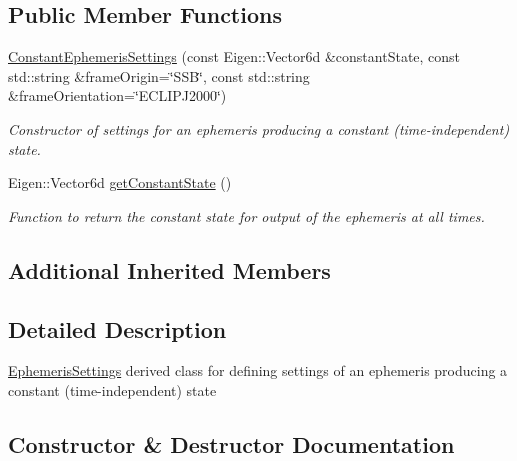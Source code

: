 \subsection*{Public Member Functions}
\begin{DoxyCompactItemize}
\item 
\hyperlink{classtudat_1_1simulation__setup_1_1ConstantEphemerisSettings_a8ae2c1f03a66ae4961f440b04425e58c}{Constant\+Ephemeris\+Settings} (const Eigen\+::\+Vector6d \&constant\+State, const std\+::string \&frame\+Origin=\char`\"{}S\+SB\char`\"{}, const std\+::string \&frame\+Orientation=\char`\"{}E\+C\+L\+I\+P\+J2000\char`\"{})
\begin{DoxyCompactList}\small\item\em Constructor of settings for an ephemeris producing a constant (time-\/independent) state. \end{DoxyCompactList}\item 
Eigen\+::\+Vector6d \hyperlink{classtudat_1_1simulation__setup_1_1ConstantEphemerisSettings_ae8e3890781719e6d8bc6829188e50d53}{get\+Constant\+State} ()
\begin{DoxyCompactList}\small\item\em Function to return the constant state for output of the ephemeris at all times. \end{DoxyCompactList}\end{DoxyCompactItemize}
\subsection*{Additional Inherited Members}


\subsection{Detailed Description}
\hyperlink{classtudat_1_1simulation__setup_1_1EphemerisSettings}{Ephemeris\+Settings} derived class for defining settings of an ephemeris producing a constant (time-\/independent) state 

\subsection{Constructor \& Destructor Documentation}
